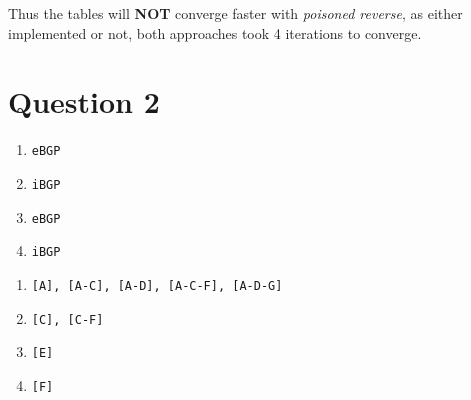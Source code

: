 \documentclass[12pt]{article}
\newcommand{\ilc}{\texttt}
\begin{document}
Thus the tables will \textbf{NOT} converge faster with \textit{poisoned reverse}, as either implemented or not, both approaches took 4 iterations to converge.

\section{Question 2}

\begin{enumerate}[label=(\alph*)]
    \item \ilc{eBGP}
    \item \ilc{iBGP}
    \item \ilc{eBGP}
    \item \ilc{iBGP}
\end{enumerate}

\smallskip

\begin{enumerate}[label=(\roman*)]
    \item \ilc{[A], [A-C], [A-D], [A-C-F], [A-D-G]}
    \item \ilc{[C], [C-F]}
    \item \ilc{[E]}
    \item \ilc{[F]}
\end{enumerate}


%
% 
% 
\end{document}

